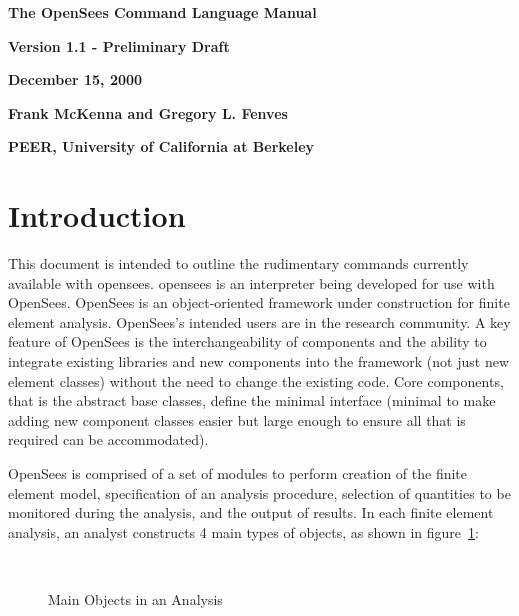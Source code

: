 \documentclass[12pt]{article}
\begin{document}


\begin{center}
{\bf \Large The OpenSees Command Language Manual} 

{\bf Version 1.1 - Preliminary Draft} 

{\bf  December 15, 2000} 

{\bf  Frank McKenna and Gregory L. Fenves} 

{\bf  PEER, University of California at Berkeley}
\end{center}

\vspace{.2in}
\section{Introduction}
This document is intended to outline the rudimentary commands
currently available with opensees. opensees is an interpreter being developed for
use with OpenSees. OpenSees is an object-oriented framework under construction for
finite element analysis. OpenSees's intended users are in the research
community. A key feature of OpenSees is the interchangeability of components
and the ability to integrate existing libraries and new components
into the framework (not just new element classes) without the need to
change the existing code. Core components, that is the abstract base
classes, define the minimal interface (minimal to make adding new
component classes easier but large enough to ensure all that is
required can be accommodated). 

OpenSees is comprised of a set of modules to perform creation of the finite 
element model, specification of an analysis procedure, selection
of quantities to be monitored during the analysis, and the output of
results. In each finite element analysis, an analyst constructs 4 main
types of objects, as shown in figure~\ref{main}:


\begin{figure}[htpb]
\begin{center}
\leavevmode
\hbox{%
}
\end{center}
\caption{Main Objects in an Analysis}
\label{main}
\end{figure}
\end{document}
